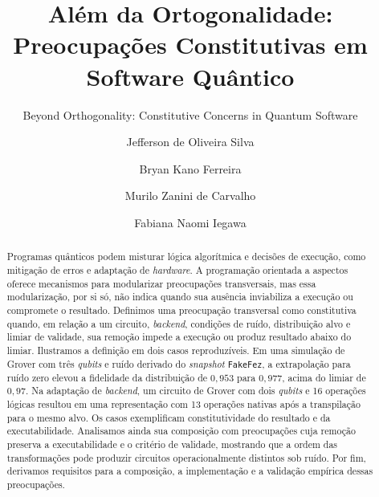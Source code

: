 \documentclass[sigconf]{acmart}
\begin{document}
\title{Além da Ortogonalidade: Preocupações Constitutivas em Software Quântico}
\subtitle{Beyond Orthogonality: Constitutive Concerns in Quantum Software}

\author{Jefferson de Oliveira Silva}

\author{Bryan Kano Ferreira}

\author{Murilo Zanini de Carvalho}

\author{Fabiana Naomi Iegawa}

\renewcommand{\shortauthors}{Silva et al.}
\renewcommand{\shorttitle}{Além da Ortogonalidade}

\begin{abstract}
Programas quânticos podem misturar lógica algorítmica e decisões de execução, como mitigação de erros e adaptação de \textit{hardware}. A programação orientada a aspectos oferece mecanismos para modularizar preocupações transversais, mas essa modularização, por si só, não indica quando sua ausência inviabiliza a execução ou compromete o resultado. Definimos uma preocupação transversal como constitutiva quando, em relação a um circuito, \textit{backend}, condições de ruído, distribuição alvo e limiar de validade, sua remoção impede a execução ou produz resultado abaixo do limiar. Ilustramos a definição em dois casos reproduzíveis. Em uma simulação de Grover com três \textit{qubits} e ruído derivado do \textit{snapshot} \texttt{FakeFez}, a extrapolação para ruído zero elevou a fidelidade da distribuição de $0{,}953$ para $0{,}977$, acima do limiar de $0{,}97$. Na adaptação de \textit{backend}, um circuito de Grover com dois \textit{qubits} e 16 operações lógicas resultou em uma representação com 13 operações nativas após a transpilação para o mesmo alvo. Os casos exemplificam constitutividade do resultado e da executabilidade. Analisamos ainda sua composição com preocupações cuja remoção preserva a executabilidade e o critério de validade, mostrando que a ordem das transformações pode produzir circuitos operacionalmente distintos sob ruído. Por fim, derivamos requisitos para a composição, a implementação e a validação empírica dessas preocupações.
\end{abstract}
\end{document}
